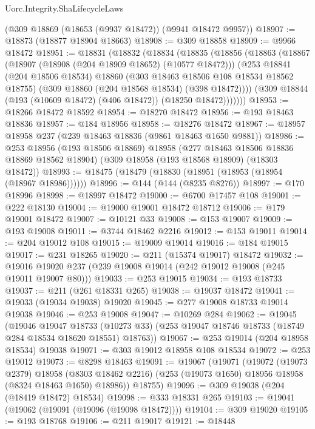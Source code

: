 \begin{lexlean}{Uorc.Integrity.ShaLifecycleLaws}
\begin{coremodule}
    (@309 @18869 (@18653 (@9937 @18472)) (@9941 @18472 @9957))
@18907 := @18873 (@18877 @18904 @18663)
@18908 := @309 @18858
@18909 := @9966 @18472
@18951 := @18831
    (@18832
      (@18834
        (@18835
          (@18856
            (@18863
              (@18867
                (@18907 (@18908 (@204 @18909 @18652) (@10577 @18472)))
                (@253
                  @18841
                  (@204 @18506 @18534)
                  @18860
                  (@303 @18463 @18506 @108 @18534 @18562 @18755)
                  (@309 @18860 (@204 @18568 @18534) (@398 @18472))))
              (@309 @18844 (@193 (@10609 @18472) (@406 @18472)) (@18250 @18472)))))))
@18953 := @18266 @18472 @18592
@18954 := @18270 @18472
@18956 := @193 @18463 @18836
@18957 := @184 @18956
@18958 := @18276 @18472
@18967 := @18957 @18958 @237 (@239 @18463 @18836 (@9861 @18463 @1650 @9881))
@18986 := @253
    @18956
    (@193 @18506 @18869)
    @18958
    (@277 @18463 @18506 @18836 @18869 @18562 @18904)
    (@309 @18958 (@193 @18568 @18909) (@18303 @18472))
@18993 := @18475 (@18479 (@18830 (@18951 (@18953 (@18954 (@18967 @18986))))))
@18996 := @144 (@144 (@8235 @8276))
@18997 := @170 @18996
@18998 := @18997 @18472
@19000 := @6700 @17457 @108
@19001 := @222 @18130
@19004 := @19000 @19001 @18472 @18712
@19006 := @179 @19001 @18472
@19007 := @10121 @33
@19008 := @153 @19007
@19009 := @193 @19008
@19011 := @3744 @18462 @2216
@19012 := @153 @19011
@19014 := @204 @19012 @108
@19015 := @19009 @19014
@19016 := @184 @19015
@19017 := @231 @18265
@19020 := @211 (@15374 @19017) @18472
@19032 := @19016 @19020 @237 (@239 @19008 @19014 (@242 @19012 @19008 (@245 @19011 @19007 @80)))
@19033 := @253 @19015
@19034 := @193 @18733
@19037 := @211 (@261 @18331 @265)
@19038 := @19037 @18472
@19041 := @19033 (@19034 @19038) @19020
@19045 := @277 @19008 @18733 @19014 @19038
@19046 := @253 @19008
@19047 := @10269 @284
@19062 := @19045
    (@19046
      @19047
      @18733
      (@10273 @33)
      (@253 @19047 @18746 @18733 (@18749 @284 @18534 @18620 @18551) @18763))
@19067 := @253 @19014 (@204 @18958 @18534) @19038
@19071 := @303 @19012 @18958 @108 @18534
@19072 := @253 @19012
@19073 := @8298 @18463
@19091 := @19067
    (@19071
      (@19072
        (@19073 @2379)
        @18958
        (@8303 @18462 @2216)
        (@253 (@19073 @1650) @18956 @18958 (@8324 @18463 @1650) @18986))
      @18755)
@19096 := @309 @19038 (@204 (@18419 @18472) @18534)
@19098 := @333 @18331 @265
@19103 := @19041 (@19062 (@19091 (@19096 (@19098 @18472))))
@19104 := @309 @19020
@19105 := @193 @18768
@19106 := @211 @19017
@19121 := @18448

\end{coremodule}
\end{lexlean}
